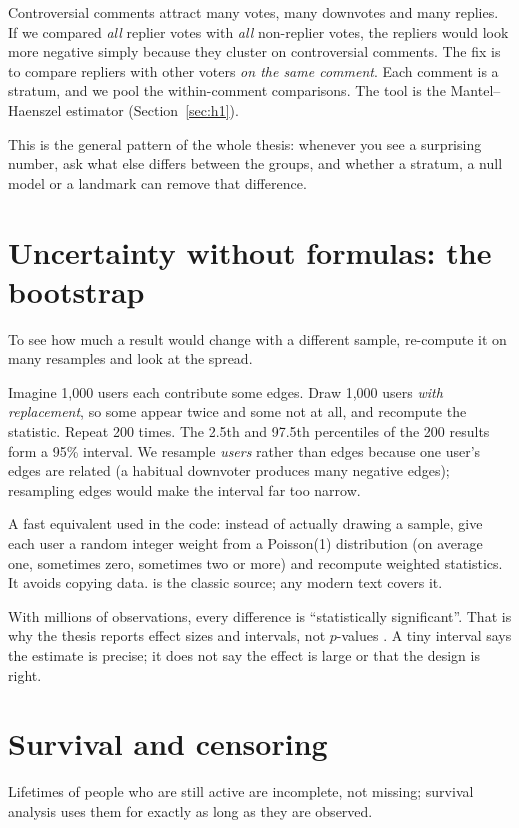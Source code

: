 Controversial comments attract many votes, many downvotes and many replies. If we compared \emph{all} replier votes with \emph{all} non-replier votes, the repliers would look more negative simply because they cluster on controversial comments. The fix is to compare repliers with other voters \emph{on the same comment}. Each comment is a stratum, and we pool the within-comment comparisons. The tool is the Mantel--Haenszel estimator (Section~\ref{sec:h1}).

This is the general pattern of the whole thesis: whenever you see a surprising number, ask what else differs between the groups, and whether a stratum, a null model or a landmark can remove that difference.

\section{Uncertainty without formulas: the bootstrap}\label{sec:bootstrap}
\begin{idea}
To see how much a result would change with a different sample, re-compute it on many resamples and look at the spread.
\end{idea}

Imagine 1,000 users each contribute some edges. Draw 1,000 users \emph{with replacement}, so some appear twice and some not at all, and recompute the statistic. Repeat 200 times. The 2.5th and 97.5th percentiles of the 200 results form a 95\% interval. We resample \emph{users} rather than edges because one user's edges are related (a habitual downvoter produces many negative edges); resampling edges would make the interval far too narrow.

A fast equivalent used in the code: instead of actually drawing a sample, give each user a random integer weight from a Poisson(1) distribution (on average one, sometimes zero, sometimes two or more) and recompute weighted statistics. It avoids copying data.  is the classic source; any modern text covers it.

\begin{pitfall}
With millions of observations, every difference is ``statistically significant''. That is why the thesis reports effect sizes and intervals, not $p$-values . A tiny interval says the estimate is precise; it does not say the effect is large or that the design is right.
\end{pitfall}

\section{Survival and censoring}\label{sec:survival}
\begin{idea}
Lifetimes of people who are still active are incomplete, not missing; survival analysis uses them for exactly as long as they are observed.
\end{idea}


